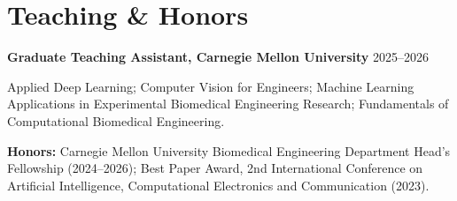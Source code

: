 \documentclass[letterpaper,10pt]{article}
\begin{document}

\section{Teaching \& Honors}

\small{

\textbf{Graduate Teaching Assistant, Carnegie Mellon University}
\hfill 2025--2026

Applied Deep Learning; Computer Vision for Engineers;
Machine Learning Applications in Experimental Biomedical Engineering Research;
Fundamentals of Computational Biomedical Engineering.

\vspace{3pt}

\textbf{Honors:}
Carnegie Mellon University Biomedical Engineering Department Head's Fellowship
(2024--2026);
Best Paper Award, 2nd International Conference on Artificial Intelligence,
Computational Electronics and Communication (2023).

}
\end{document}
